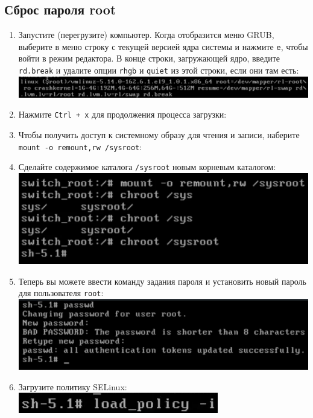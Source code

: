 \documentclass[12pt]{article}
\begin{document}
\subsection{Сброс пароля root}
\begin{enumerate}
	\item Запустите (перегрузите) компьютер. Когда отобразится меню GRUB, выберите в меню строку с текущей версией ядра системы и нажмите \texttt{e}, чтобы войти в режим редактора.
	      В конце строки, загружающей ядро, введите \texttt{rd.break} и удалите опции \texttt{rhgb} и \texttt{quiet} из этой строки, если они там есть:
	      \\\includegraphics{10.png}
	\item Нажмите \texttt{Ctrl + x} для продолжения процесса загрузки:
	\item Чтобы получить доступ к системному образу для чтения и записи, наберите \texttt{mount -o remount,rw /sysroot}:
	\item Сделайте содержимое каталога \texttt{/sysroot} новым корневым каталогом:
	      \\\includegraphics{11.png}
	\item Теперь вы можете ввести команду задания пароля и установить новый пароль для пользователя \texttt{root}:
	      \\\includegraphics{12.png}
	\item Загрузите политику SELinux:
	      \\\includegraphics{13.png}

\end{enumerate}
\end{document}

